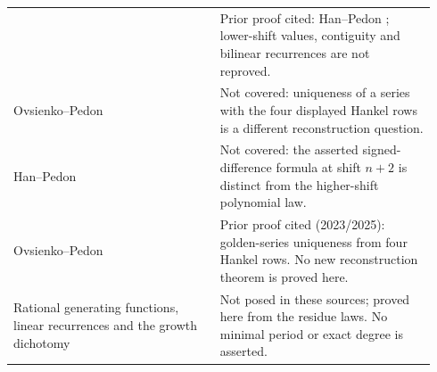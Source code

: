 \documentclass[11pt,a4paper]{article}
\begin{document}
\begin{longtable}{@{}p{0.46\linewidth}p{0.48\linewidth}@{}}
 & Prior proof cited: Han--Pedon \cite[Theorems B--D]{HP}; lower-shift
 values, contiguity and bilinear recurrences are not reproved.\\
Ovsienko--Pedon \cite[p.~9, silver uniqueness question]{OP}
 & Not covered: uniqueness of a series with the four displayed Hankel
 rows is a different reconstruction question.\\
Han--Pedon \cite[p.~23, Remark 4.5]{HPplus}
 & Not covered: the asserted signed-difference formula at shift $n+2$
 is distinct from the higher-shift polynomial law.\\
Ovsienko--Pedon \cite[Theorem 1.7]{OP}
 & Prior proof cited (2023/2025): golden-series uniqueness from four
 Hankel rows. No new reconstruction theorem is proved here.\\
Rational generating functions, linear recurrences and the growth dichotomy
 & Not posed in these sources; proved here from the residue laws.
 No minimal period or exact degree is asserted.\\\bottomrule
\end{longtable}
\endgroup
\end{document}

